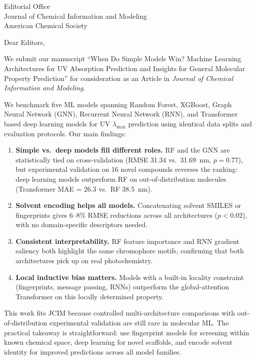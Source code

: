 \documentclass[11pt]{letter}
\begin{document}
\begin{letter}{Editorial Office\\
Journal of Chemical Information and Modeling\\
American Chemical Society}

\opening{Dear Editors,}

We submit our manuscript ``When Do Simple Models Win? Machine Learning Architectures for UV Absorption Prediction and Insights for General Molecular Property Prediction'' for consideration as an Article in \textit{Journal of Chemical Information and Modeling}.

We benchmark five ML models spanning Random Forest, XGBoost, Graph Neural Network (GNN), Recurrent Neural Network (RNN), and Transformer based deep learning models for UV $\lambda_{\max}$ prediction using identical data splits and evaluation protocols. Our main findings:

\begin{enumerate}
    \item \textbf{Simple vs.\ deep models fill different roles.} RF and the GNN are statistically tied on cross-validation (RMSE 31.34 vs.\ 31.69~nm, $p = 0.77$), but experimental validation on 16 novel compounds reverses the ranking: deep learning models outperform RF on out-of-distribution molecules (Transformer MAE = 26.3 vs.\ RF 38.5~nm).

    \item \textbf{Solvent encoding helps all models.} Concatenating solvent SMILES or fingerprints gives 6--8\% RMSE reductions across all architectures ($p < 0.02$), with no domain-specific descriptors needed.

    \item \textbf{Consistent interpretability.} RF feature importance and RNN gradient saliency both highlight the same chromophore motifs, confirming that both architectures pick up on real photochemistry.

    \item \textbf{Local inductive bias matters.} Models with a built-in locality constraint (fingerprints, message passing, RNNs) outperform the global-attention Transformer on this locally determined property.
\end{enumerate}

This work fits JCIM because controlled multi-architecture comparisons with out-of-distribution experimental validation are still rare in molecular ML. The practical takeaway is straightforward: use fingerprint models for screening within known chemical space, deep learning for novel scaffolds, and encode solvent identity for improved predictions across all model families.


\end{letter}
\end{document}
